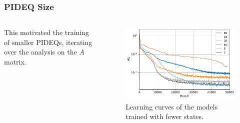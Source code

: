 \documentclass[t]{beamer}
\begin{document}
\begin{frame}
    \frametitle{PIDEQ Size}
    \begin{columns}[c]
    \begin{column}{.4\textwidth}
	This motivated the training of smaller PIDEQs, iterating over the analysis on the $A$ matrix.
    \end{column}
    \begin{column}{.6\textwidth}
	\begin{figure}[h]
	    \centering
	    \includegraphics[width=\textwidth]{../images/exp_2_iae.pdf}
	    \caption{Learning curves of the models trained with fewer states.}
	    \label{fig:states-iae}
	\end{figure}
    \end{column}
    \end{columns}
\end{frame}
\end{document}
